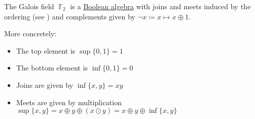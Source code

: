\begin{theorem}\label{thm:f2_is_boolean_algebra}
  The Galois field \( \BbbF_2 \) is a \hyperref[def:boolean_algebra]{Boolean algebra} with joins and meets induced by the ordering (see ) and complements given by \( \neg x \coloneqq x \mapsto x \oplus 1 \).

  More concretely:
  \begin{itemize}
    \item The top element is \( \sup \{ 0, 1 \} = 1 \)
    \item The bottom element is \( \inf \{ 0, 1 \} = 0 \)
    \item Joins are given by \( \inf \{ x, y \} = xy \)
    \item Meets are given by multiplication \( \sup \{ x, y \} = x \oplus y \oplus (x \odot y) = x \oplus y \oplus \inf \{ x, y \} \)
  \end{itemize}
\end{theorem}
